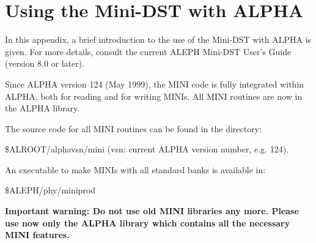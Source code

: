 \chapter{\label{sec-miniapp}Using the Mini-DST with ALPHA}
\par
In this appendix, a brief introduction to the use of the Mini-DST
with ALPHA is given. For more details, consult the current
ALEPH Mini-DST User's Guide (version 8.0 or later).

Since ALPHA version 124 (May 1999), the MINI code is fully integrated within ALPHA, both
for reading and for writing MINIs. All MINI routines are now in the ALPHA library.

The source code for all MINI routines can be found in the directory:

\$ALROOT/alphavsn/mini     (vsn: current ALPHA version number, e.g. 124). 

An executable to make MINIs with all standard banks    is available in:

\$ALEPH/phy/miniprod

{\bf Important warning: Do not use old MINI libraries any more. Please use now
 only the ALPHA library which contains all the necessary MINI features.} 

\par
